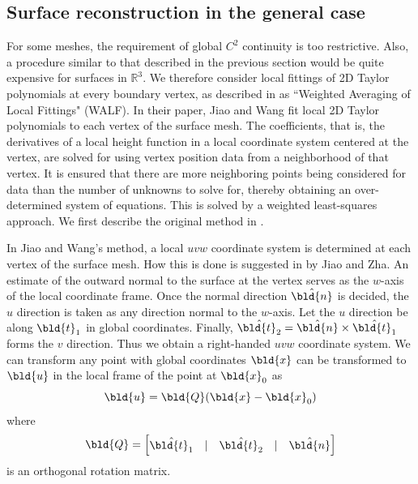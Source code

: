 \usepackage{booktabs}  %
\usepackage{amsmath}
\usepackage{amssymb}
\usepackage{textcomp}  %
\usepackage{xcolor}
\usepackage{lipsum}    %
\usepackage{subfig}    %
\usepackage{url}
\usepackage{placeins}

\subsection{Surface reconstruction in the general case}
For some meshes, the requirement of global $C^2$ continuity is too restrictive. Also, a procedure similar to that described in the previous section would be quite expensive for surfaces in $\mathbb{R}^3$. We therefore consider local fittings of 2D Taylor polynomials at every boundary vertex, as described in \cite{sr:jiaowang} as ``Weighted Averaging of Local Fittings" (WALF). In their paper, Jiao and Wang fit local 2D Taylor polynomials to each vertex of the surface mesh. The coefficients, that is, the derivatives of a local height function in a local coordinate system centered at the vertex, are solved for using vertex position data from a neighborhood of that vertex. It is ensured that there are more neighboring points being considered for data than the number of unknowns to solve for, thereby obtaining an over-determined system of equations. This is solved by a weighted least-squares approach. We first describe the original method in \cite{sr:jiaowang}.

In Jiao and Wang's method, a local $uvw$ coordinate system is determined at each vertex of the surface mesh. How this is done is suggested in \cite{sr:diffquant} by Jiao and Zha. An estimate of the outward normal to the surface at the vertex serves as the $w$-axis of the local coordinate frame. Once the normal direction $\hat{\bld{n}}$ is decided, the $u$ direction is taken as any direction normal to the $w$-axis. Let the $u$ direction be along $\bld{t}_1$ in global coordinates. Finally, $\hat{\bld{t}_2} = \hat{\bld{n}} \times \hat{\bld{t}_1}$ forms the $v$ direction. Thus we obtain a right-handed $uvw$ coordinate system. We can transform any point with global coordinates $\bld{x}$ can be transformed to $\bld{u}$ in the local frame of the point at $\bld{x}_0$ as
\begin{equation}
\bld{u} = \bld{Q} (\bld{x} - \bld{x}_0)
\end{equation}
where
\begin{equation}
\bld{Q} =
\begin{bmatrix}
\hat{\bld{t}_1} & \vert & \hat{\bld{t}_2} & \vert & \hat{\bld{n}}
\end{bmatrix}
\end{equation}
is an orthogonal rotation matrix.

